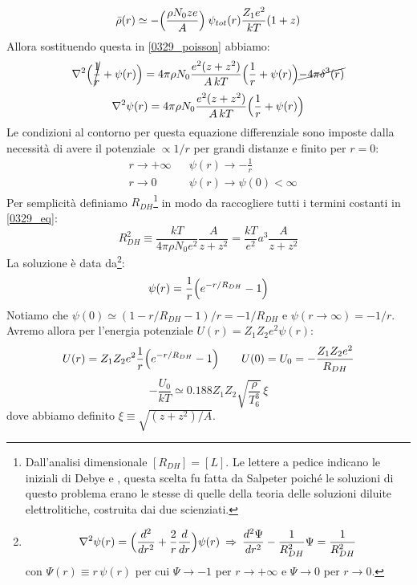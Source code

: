 \begin{equation}\label{0329_rho}
    \bar{\rho} (r) \simeq - \Bigl ( \frac{\rho N_0ze}{A} \Bigr )\: \psi_{tot}(r) \frac{Z_1e^2}{kT} (1+z)
\end{equation}
Allora sostituendo questa in \eqref{0329_poisson} abbiamo:
$$\nabla^2 \Bigl ( \cancel{\frac{1}{r}} + \psi(r) \Bigr ) = 4\pi \rho N_0 \frac{e^2(z+z^2)}{A\, kT}  \Bigl ( \frac{1}{r} +\psi(r) \Bigr ) \cancel{-4\pi \delta^3(r)}$$
\begin{equation}\label{0329_eq}
    \nabla^2 \psi(r) = 4\pi \rho N_0 \frac{e^2(z+z^2)}{A\, kT}  \Bigl ( \frac{1}{r} +\psi(r) \Bigr )
\end{equation}
Le condizioni al contorno per questa equazione differenziale sono imposte dalla necessità di avere il potenziale $\propto 1/r$ per grandi distanze e finito per $r=0$:
\begin{displaymath}
\begin{aligned}
&r\to +\infty & &\psi(r) \to -\frac{1}{r}\\
&r\to 0 & &\psi(r) \to \psi(0)<\infty
\end{aligned}
\end{displaymath}
Per semplicità definiamo $R_{DH}$\footnote{Dall'analisi dimensionale $[R_{DH}] = [L]$. Le lettere a pedice indicano le iniziali di Debye e \Huckel{}, questa scelta fu fatta da Salpeter poiché le soluzioni di questo problema erano le stesse di quelle della teoria delle soluzioni diluite elettrolitiche, costruita dai due scienziati.} in modo da raccogliere tutti i termini costanti in \eqref{0329_eq}:
$$R_{DH}^2 \equiv \frac{kT}{4\pi \rho N_0e^2} \frac{A}{z+z^2} = \frac{kT}{e^2} a^3 \frac{A}{z+z^2}$$
La soluzione è data da\footnote{$$\nabla^2 \psi(r) = \Bigl ( \frac{d^2}{dr^2} + \frac{2}{r}\frac{d}{dr} \Bigr )\psi(r)\: \Rightarrow\: \frac{d^2\Psi}{dr^2} - \frac{1}{R_{DH}^2}\Psi = \frac{1}{R_{DH}^2} $$%
con $\Psi (r) \equiv r\,\psi(r)$ per cui $\Psi \to -1$ per $r\to+\infty$ e $\Psi \to 0$ per $r\to 0$.}:
$$\psi(r) = \frac{1}{r}\Bigl ( e^{-r/R_{DH}}-1 \Bigr )$$
Notiamo che $\psi(0)\simeq (1-r/R_{DH}-1)/r=-1/R_{DH}$ e $\psi(r\to\infty)=-1/r$. Avremo allora per l'energia potenziale $U(r) = Z_1Z_2 e^2 \psi(r)$:
$$U(r) = Z_1Z_2 e^2 \frac{1}{r} \Bigl ( e^{-r/R_{DH}}-1 \Bigr ) \qquad U(0)=U_0 = -\frac{Z_1Z_2 e^2}{R_{DH}}$$
\begin{equation}\label{0329_U0}
-\frac{U_0}{kT}\simeq 0.188 Z_1Z_2 \sqrt{\frac{\rho}{T_6^3}}\,\xi
\end{equation}
dove abbiamo definito $\xi\equiv \sqrt{(z+z^2)/A}$.

